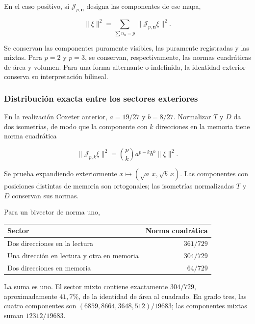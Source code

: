 En el caso positivo, si
\(\mathcal J_{p,\mathbf n}\) designa las componentes de ese mapa,



\begin{equation}
\boxed{\|\xi\|^2=\sum_{\sum n_a=p}
\|\mathcal J_{p,\mathbf n}\xi\|^2.}
\label{nuc11:eq:21}
\end{equation}



Se conservan las componentes puramente visibles, las puramente
registradas y las mixtas.
Para \(p=2\) y \(p=3\), se conservan, respectivamente, las normas
cuadráticas de área y volumen.
Para una forma alternante o indefinida, la identidad exterior
conserva su interpretación bilineal.

\subsubsection{Distribución exacta entre los sectores exteriores}

En la realización Coxeter anterior,
\(a=19/27\) y \(b=8/27\).
Normalizar \(T\) y \(D\) da dos isometrías, de modo que la
componente con \(k\) direcciones en la memoria tiene norma cuadrática



\begin{equation}
\boxed{
\|\mathcal J_{p,k}\xi\|^2=
\binom pk a^{p-k}b^k\|\xi\|^2.
}
\label{nuc11:eq:22}
\end{equation}



Se prueba expandiendo exteriormente
\(x\mapsto(\sqrt a\,x,\sqrt b\,x)\).
Las componentes con posiciones distintas de memoria son
ortogonales; las isometrías normalizadas \(T\) y \(D\)
conservan sus normas.

Para un bivector de norma uno,

\begin{center}
\begin{tabular}{@{}lr@{}}
\toprule
Sector & Norma cuadrática\\
\midrule
Dos direcciones en la lectura & \(361/729\)\\
Una dirección en lectura y otra en memoria & \(304/729\)\\
Dos direcciones en memoria & \(64/729\)\\
\bottomrule
\end{tabular}
\end{center}

La suma es uno. El sector mixto contiene exactamente \(304/729\),
aproximadamente \(41{,}7\%\), de la identidad de área al cuadrado.
En grado tres, las cuatro componentes son
\((6859,8664,3648,512)/19683\); las componentes mixtas suman
\(12312/19683\).

